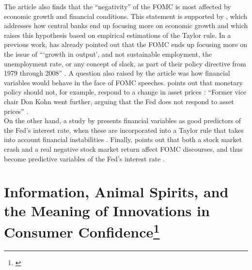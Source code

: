 The article also finds that the ``negativity'' of the FOMC is most affected by economic growth and financial conditions. This statement is supported by \cite{walsh2003speed}, which addresses how central banks end up focusing more on economic growth and \cite{coibion2011monetary} which raises this hypothesis based on empirical estimations of the Taylor rule. In a previous work, \cite{thornton2011does} has already pointed out that the FOMC ends up focusing more on the issue of ```growth in output', and not sustainable employment, the unemployment rate, or any concept of slack, as part of their policy directive from 1979 through 2008'' \cite[p.34]{shapiro2021taking}. A question also raised by the article was how financial variables would behave in the face of FOMC speeches. \cite{bernanke2001should} points out that monetary policy should not, for example, respond to a change in asset prices \cite[p.33]{shapiro2021taking}: ``Former vice chair Don Kohn \cite{kohn2006monetary, kohn2009monetary} went further, arguing that the Fed does not respond to asset prices'' \cite[p.33]{shapiro2021taking}.\\

On the other hand, a study by \cite{peek2015should} presents financial variables as good predictors of the Fed's interest rate, when these are incorporated into a Taylor rule that takes into account financial instabilities \cite[p.33]{shapiro2021taking}. Finally, \cite{cieslak2021economics} points out that both a stock market crash and a real negative stock market return affect FOMC discourses, and thus become predictive variables of the Fed's interest rate \cite[p.33]{shapiro2021taking}.\\

\section{Information, Animal Spirits, and the Meaning of Innovations in Consumer Confidence\protect\footnote{\cite{barsky2012information}}}


